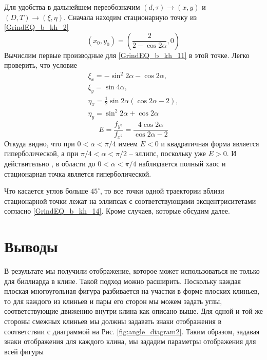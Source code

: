 \documentclass[a4paper]{article}
\begin{document}
Для удобства в дальнейшем переобозначим $(d,\tau)\rightarrow(x,y)$ и $(D,T)\rightarrow(\xi,\eta)$. Сначала находим стационарную точку из \eqref{GrindEQ_b_kh_2}
\begin{equation} \label{GrindEQ_b_kh_13}
(x_0,y_0)=\left(\dfrac{2}{2-\cos 2\alpha},0\right)
\end{equation}
Вычислим первые производные для \eqref{GrindEQ_b_kh_11} в этой точке. Легко проверить, что условие  
\begin{equation}
\begin{array}{lr}
\xi _x=-\sin ^2 2 \alpha-\cos 2 \alpha, \\
\xi _y=\sin 4\alpha, \\
\eta _x=\frac{1}{2} \sin 2 \alpha (\cos 2 \alpha-2), \\
\eta _y=\sin ^2 2 \alpha+\cos 2\alpha
\end{array}
\end{equation}
\begin{equation} \label{GrindEQ_b_kh_14}
E=\frac{f_{y^2}}{f_{x^2}}=\frac{4\cos 2\alpha}{\cos 2\alpha-2}
\end{equation}
Откуда видно, что при $0<\alpha<\pi/4$ имеем $E<0$ и квадратичная форма является гиперболической, а при $\pi/4<\alpha<\pi/2$ -- эллипс, поскольку уже $E>0$. И действительно , в области до $0<\alpha<\pi/4$ наблюдается полный хаос и стационарная точка является гиперболической.

Что касается углов больше $45^{\circ}$, то все точки одной траектории вблизи стационарной точки лежат на эллипсах с соответствующими эксцентриситетами согласно \eqref{GrindEQ_b_kh_14}. Кроме случаев, которые обсудим далее.



\section{Выводы}

         В результате мы получили отображение, которое может использоваться не только для биллиарда в клине. Такой подход  можно расширить. Поскольку каждая плоская многоугольная фигура разбивается на участки в форме плоских клиньев, то для каждого из клиньев и пары его сторон мы можем задать углы, соответствующие движению внутри клина как описано выше. Для одной и той же стороны смежных клиньев мы должны задавать знаки отображения в соответствии с диаграммой на Рис. \ref{fig:angle_diagram2}. Таким образом, задавая знаки отображения для каждого клина, мы зададим параметры отображения для всей фигуры 
         
\end{document}
